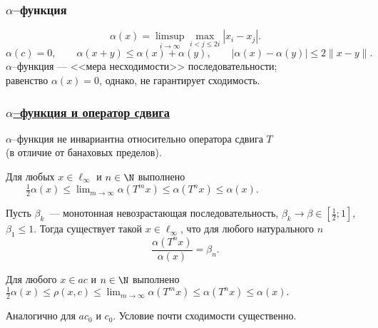\begin{frame}\frametitle{$\alpha$--функция}
	\label{page:alpha_function}
	\begin{equation}
		\alpha(x) = \limsup_{i\to\infty} \max_{i<j\leqslant 2i} |x_i - x_j|
		.
	\end{equation}
	\vfill
	\begin{equation}
		\alpha(c)=0,
		\qquad
		\alpha(x+y) \leq \alpha(x) + \alpha(y),
		\qquad
		|\alpha(x) - \alpha(y)| \leq 2 \|x-y\|
		.
	\end{equation}
	\vfill
	$\alpha$--функция --- <<мера несходимости>> последовательности;
	\\
	равенство $\alpha(x) = 0$, однако, не гарантирует сходимость.

\end{frame}

\begin{frame}\frametitle{\underline{$\alpha$--функция и оператор сдвига}}
	\vfill
	$\alpha$--функция не инвариантна относительно оператора сдвига $T$
	\\
	(в отличие от банаховых пределов).

	\begin{ttheorem}
		Для любых $x\in\ell_\infty$ и $n \in \N$
		выполнено
		$\displaystyle\qquad
			\frac{1}{2}\alpha(x) \leq \lim_{m\to\infty} \alpha(T^m x)\leq\alpha(T^n x) \leq \alpha(x)
			.
		$
	\end{ttheorem}

	\vfill

	\begin{ttheorem}
		Пусть $\beta_k$~--- монотонная невозрастающая последовательность,
		$\beta_k \to \beta \in\left[\frac{1}{2}; 1\right]$, $\beta_1 \leq 1$.
		Тогда существует такой $x\in\ell_\infty$, что для любого натурального $n$
		\begin{equation}
			\frac{\alpha(T^n x)}{\alpha(x)} = \beta_n.
		\end{equation}
	\end{ttheorem}
	\vspace{-1.46em}
	\begin{ttheorem}
		\label{thm:rho_x_c_leq_alpha_t_s_x}
		Для любого $x\in ac$ и $n \in \N$
		выполнено
		$\displaystyle
			\frac{1}{2}\alpha(x) \leq \rho(x,c) \leq
			\lim_{m\to\infty} \alpha(T^m x)\leq \alpha(T^n x)
			\leq
			\alpha(x)
			.
		$
	\end{ttheorem}
	Аналогично для $ac_0$ и $c_0$. Условие почти сходимости существенно.

	\vfill
\end{frame}



